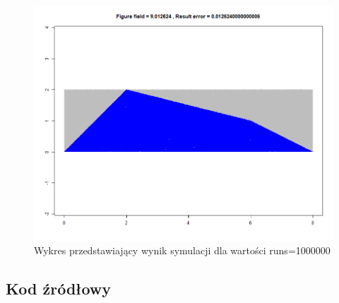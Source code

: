 \documentclass[a4paper,11pt,titlepage]{article}
\begin{document}
\begin{figure}[H]
\centering
\includegraphics[width=1\columnwidth]{img/figure1m.PNG}
\caption{Wykres przedstawiający wynik symulacji dla wartości runs=1000000}
\label{fig:figure1m}
\end{figure}

\subsection{Kod źródłowy}

\end{document}
